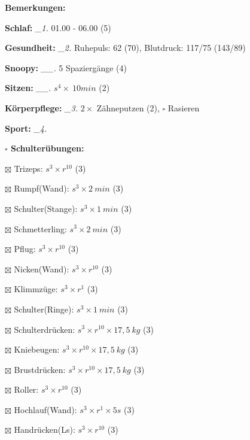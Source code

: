 \documentclass[10pt,a4paper]{article}
\newcommand\prop[1] {{\color {alizarin} {\bf #1}}}             %
\newcommand\mand[1] {{\color {burntorange} {\bf #1}}}          %
\newcommand\topspace{\vskip -15pt \hskip 20pt}
\newcommand\n[1] { {\sl #1.} \hskip 5pt }
\begin{document}
\begin{mdframed}[style=daystyle]
  \begin{labeling}{{\mand {Bemerkungen:}}}
    \setlength\itemsep{-3pt}
  \item[{\mand {Schlaf:}}]         \n{\_1} 01.00 - 06.00 (5)
  \item[{\mand {Gesundheit:}}]     \n{\_2} Ruhepuls: 62 (70), Blutdruck: 117/75 (143/89)
  \item[{\mand {Snoopy:}}]        \n{\_\_} 5 Spaziergänge (4)
  \item[{\mand {Sitzen:}}]        \n{\_\_} $s^4 \times\ 10 min$ (2)
  \item[{\mand {Körperpflege:}}]   \n{\_3} $2 \times$ Zähneputzen (2), $\square$ Rasieren
  \item[{\mand {Sport:}}]          \n{\_4}
    \topspace
    \begin{minipage}{0.75\textwidth}  
      \begin{labeling}{\prop {$\square$ {Schulterübungen:}}} 
        \setlength\itemsep{-3pt}
      \item[$\boxtimes$ Trizeps:]          $s^3 \times r^{10}$ (3)
      \item[$\boxtimes$ Rumpf(Wand):]      $s^3 \times 2\ min$ (3)
      \item[$\boxtimes$ Schulter(Stange):] $s^3 \times 1\ min$ (3)
      \item[$\boxtimes$ Schmetterling:]    $s^3 \times 2\ min$ (3)
      \item[$\boxtimes$ Pflug:]            $s^3 \times r^{10}$ (3)
      \item[$\boxtimes$ Nicken(Wand):]     $s^3 \times r^{10}$ (3)
      \item[$\boxtimes$ Klimmzüge:]        $s^3 \times r^1$ (3)
      \item[$\boxtimes$ Schulter(Ringe):]  $s^3 \times 1\ min$ (3)
      \item[$\boxtimes$ Schulterdrücken:]  $s^3 \times r^{10} \times 17,5\ kg$ (3)
      \item[$\boxtimes$ Kniebeugen:]       $s^3 \times r^{10} \times 17,5\ kg$ (3)
      \item[$\boxtimes$ Brustdrücken:]     $s^3 \times r^{10} \times 17,5\ kg$ (3)
      \item[$\boxtimes$ Roller:]           $s^3 \times r^{10}$ (3)
      \item[$\boxtimes$ Hochlauf(Wand):]   $s^3 \times r^{1} \times 5s$ (3)
      \item[$\boxtimes$ Handrücken(Ls):]   $s^3 \times r^{10}$ (3)

\end{labeling}
\end{minipage}
\end{labeling}
\end{mdframed}
\end{document}
